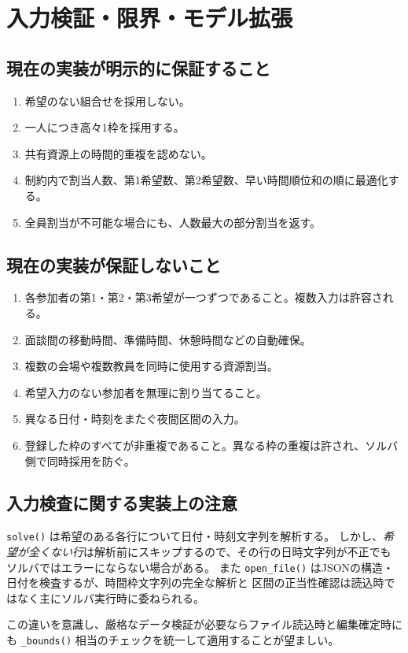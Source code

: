 \documentclass[11pt,a4paper]{ltjsarticle}
\theoremstyle{definition}
\theoremstyle{remark}
\newcommand{\code}[1]{\texttt{#1}}
\begin{document}
\section{入力検証・限界・モデル拡張}
\subsection{現在の実装が明示的に保証すること}
\begin{enumerate}
\item 希望のない組合せを採用しない。
\item 一人につき高々1枠を採用する。
\item 共有資源上の時間的重複を認めない。
\item 制約内で割当人数、第1希望数、第2希望数、早い時間順位和の順に最適化する。
\item 全員割当が不可能な場合にも、人数最大の部分割当を返す。
\end{enumerate}

\subsection{現在の実装が保証しないこと}
\begin{enumerate}
\item 各参加者の第1・第2・第3希望が一つずつであること。複数入力は許容される。
\item 面談間の移動時間、準備時間、休憩時間などの自動確保。
\item 複数の会場や複数教員を同時に使用する資源割当。
\item 希望入力のない参加者を無理に割り当てること。
\item 異なる日付・時刻をまたぐ夜間区間の入力。
\item 登録した枠のすべてが非重複であること。異なる枠の重複は許され、ソルバ側で同時採用を防ぐ。
\end{enumerate}

\subsection{入力検査に関する実装上の注意}
\code{solve()} は希望のある各行について日付・時刻文字列を解析する。
しかし、\emph{希望が全くない行}は解析前にスキップするので、その行の日時文字列が不正でも
ソルバではエラーにならない場合がある。
また \code{open\_file()} はJSONの構造・日付を検査するが、時間枠文字列の完全な解析と
区間の正当性確認は読込時ではなく主にソルバ実行時に委ねられる。

この違いを意識し、厳格なデータ検証が必要ならファイル読込時と編集確定時にも
\code{\_bounds()} 相当のチェックを統一して適用することが望ましい。
\end{document}
